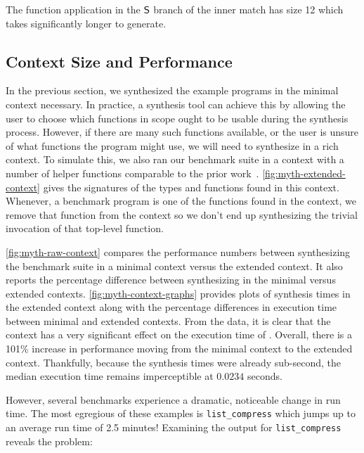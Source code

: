 The function application in the $\mathsf{S}$ branch of the inner match has size 12 which takes significantly longer to generate.

\subsection{Context Size and Performance}
\label{subsec:context-size-and-performance}



In the previous section, we synthesized the example programs in the minimal context necessary.
In practice, a synthesis tool can achieve this by allowing the user to choose which functions in scope ought to be usable during the synthesis process.
However, if there are many such functions available, or the user is unsure of what functions the program might use, we will need to synthesize in a rich context.
To simulate this, we also ran our benchmark suite in a context with a number of helper functions comparable to the prior work~.
\autoref{fig:myth-extended-context} gives the signatures of the types and functions found in this context.
Whenever, a benchmark program is one of the functions found in the context, we remove that function from the context so we don't end up synthesizing the trivial invocation of that top-level function.




\autoref{fig:myth-raw-context} compares the performance numbers between synthesizing the benchmark suite in a minimal context versus the extended context.
It also reports the percentage difference between synthesizing in the minimal versus extended contexts.
\autoref{fig:myth-context-graphs} provides plots of synthesis times in the extended context along with the percentage differences in execution time between minimal and extended contexts.
From the data, it is clear that the context has a very significant effect on the execution time of \myth{}.
Overall, there is a 101\% increase in performance moving from the minimal context to the extended context.
Thankfully, because the synthesis times were already sub-second, the median execution time remains imperceptible at $0.0234$ seconds.

However, several benchmarks experience a dramatic, noticeable change in run time.
The most egregious of these examples is \texttt{list\_compress} which jumps up to an average run time of 2.5 minutes!
Examining the output for \texttt{list\_compress} reveals the problem:

